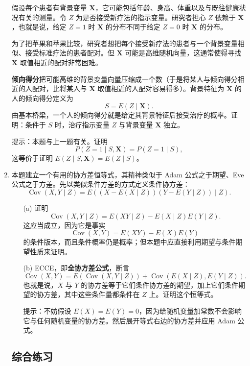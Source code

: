 \documentclass[UTF8, 12pt, fontset=fandol, oneside]{ctexart}
\begin{document}
\begin{enumerate}
  假设每个患者有背景变量 $\mathbf X$，它可能包括年龄、身高、体重以及与既往健康状况有关的测量。令 $Z$ 为是否接受新疗法的指示变量。研究者担心 $Z$ 依赖于 $\mathbf X$，也就是说，给定 $Z=1$ 时 $\mathbf X$ 的分布不同于给定 $Z=0$ 时 $\mathbf X$ 的分布。

  为了把苹果和苹果比较，研究者想把每个接受新疗法的患者与一个背景变量相似、接受标准疗法的患者配对。但 $\mathbf X$ 可能是高维随机向量，这通常使得寻找 $\mathbf X$ 取值相近的配对非常困难。

  \textbf{倾向得分}把可能高维的背景变量向量压缩成一个数（于是将某人与倾向得分相近的人配对，比将某人与 $\mathbf X$ 取值相近的人配对容易得多）。背景特征为 $\mathbf X$ 的人的倾向得分定义为
  \[
    S=E(Z\mid \mathbf X).
  \]
  由基本桥梁，一个人的倾向得分就是给定其背景特征后接受治疗的概率。证明：条件于 $S$ 时，治疗指示变量 $Z$ 与背景变量 $\mathbf X$ 独立。

  \noindent 提示：本题与上一题有关。证明
  \[
    P(Z=1\mid S,\mathbf X)=P(Z=1\mid S),
  \]
  这等价于证明 $E(Z\mid S,\mathbf X)=E(Z\mid S)$。

  \item 本题建立一个有用的协方差恒等式，其精神类似于 Adam 公式之于期望、Eve 公式之于方差。先以类似条件方差的方式定义条件协方差：
  \[
    \operatorname{Cov}(X,Y\mid Z)
    =E((X-E(X\mid Z))(Y-E(Y\mid Z))\mid Z).
  \]
  \begin{enumerate}
    \item[(a)] 证明
    \[
      \operatorname{Cov}(X,Y\mid Z)
      =E(XY\mid Z)-E(X\mid Z)E(Y\mid Z).
    \]
    这应当成立，因为它是事实
    \[
      \operatorname{Cov}(X,Y)=E(XY)-E(X)E(Y)
    \]
    的条件版本，而且条件概率仍是概率；但本题中应直接利用期望与条件期望性质来证明。

    \item[(b)] ECCE，即\textbf{全协方差公式}，断言
    \[
      \operatorname{Cov}(X,Y)
      =E(\operatorname{Cov}(X,Y\mid Z))
      +\operatorname{Cov}(E(X\mid Z),E(Y\mid Z)).
    \]
    也就是说，$X$ 与 $Y$ 的协方差等于它们条件协方差的期望，加上它们条件期望的协方差，其中这些条件量都条件在 $Z$ 上。证明这个恒等式。

    \noindent 提示：不妨假设 $E(X)=E(Y)=0$，因为给随机变量加常数不会影响它与任何随机变量的协方差。然后展开等式右边的协方差并应用 Adam 公式。
  \end{enumerate}

\subsection*{综合练习}


\end{enumerate}
\end{document}
